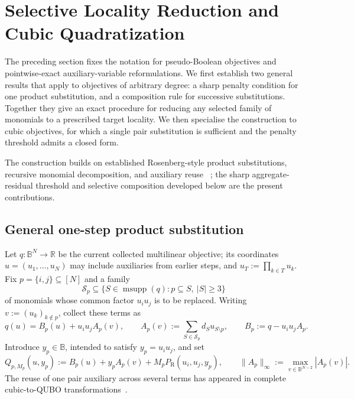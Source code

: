 \documentclass[a4paper,onecolumn,11pt,unpublished]{quantumarticle}
\theoremstyle{remark}
\begin{document}


\section{Selective Locality Reduction and Cubic Quadratization}
\label{sec:cubic-quadratization}

The preceding section fixes the notation for pseudo-Boolean objectives and
pointwise-exact auxiliary-variable reformulations.  We first establish two
general results that apply to objectives of arbitrary degree: a sharp penalty
condition for one product substitution, and a composition rule for successive
substitutions.  Together they give an exact procedure for reducing any selected
family of monomials to a prescribed target locality.  We then specialise the
construction to cubic objectives, for which a single pair substitution is
sufficient and the penalty threshold admits a closed form.

The construction builds on established Rosenberg-style product substitutions,
recursive monomial decomposition, and auxiliary reuse
~\cite{Rosenberg1975,BorosGruber2014,VermaLewisKochenberger2021,CramaEtAl2025};
the sharp aggregate-residual threshold and selective composition developed
below are the present contributions.


\subsection{General one-step product substitution}
\label{sec:one-step-substitution}

Let \(q:\mathbb{B}^N\to\mathbb{R}\) be the current collected multilinear
objective; its coordinates \(u=(u_1,\ldots,u_N)\) may include auxiliaries from
earlier steps, and \(u_T:=\prod_{k\in T}u_k\).  Fix
\(p=\{i,j\}\subseteq[N]\) and a family
\begin{equation}
  \mathcal{S}_p\subseteq
  \{S\in\operatorname{msupp}(q):p\subseteq S,\ |S|\geq3\}
  \label{eq:selected-family-one-step}
\end{equation}
of monomials whose common factor \(u_i u_j\) is to be replaced.  Writing
\(v:=(u_k)_{k\notin p}\), collect these terms as
\begin{equation}
  q(u)=B_p(u)+u_i u_j A_p(v),
  \qquad
  A_p(v):=\sum_{S\in\mathcal{S}_p}d_Su_{S\setminus p},
  \qquad
  B_p:=q-u_i u_jA_p.
  \label{eq:aggregate-residual-decomposition}
\end{equation}
Introduce \(y_p\in\mathbb{B}\), intended to satisfy \(y_p=u_i u_j\), and set
\begin{equation}
  Q_{p,M_p}(u,y_p)
  :=B_p(u)+y_pA_p(v)+M_pP_{\mathrm R}(u_i,u_j,y_p),
  \qquad
  \|A_p\|_\infty:=\max_{v\in\mathbb{B}^{N-2}}|A_p(v)|.
  \label{eq:one-step-reformulation}
\end{equation}
The reuse of one pair auxiliary across several terms has appeared in complete
cubic-to-QUBO transformations~\cite{VermaLewisKochenberger2021}.
\end{document}

